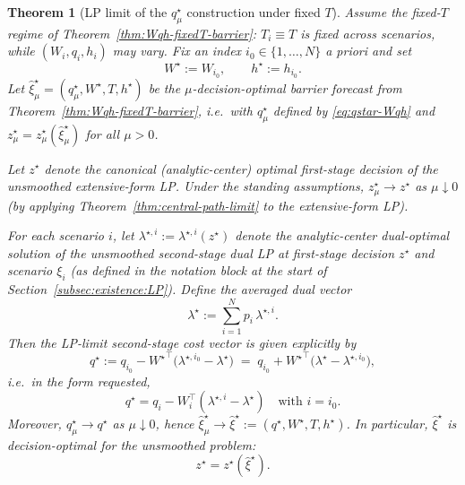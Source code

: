 \documentclass[11pt]{article}
\theoremstyle{plain}
\newtheorem{theorem}{Theorem}[section]
\theoremstyle{definition}
\theoremstyle{remark}
\begin{document}
\begin{theorem}[LP limit of the $q_\mu^\star$ construction under fixed $T$]\label{thm:Wqh-fixedT-LP}
Assume the fixed-$T$ regime of Theorem~\ref{thm:Wqh-fixedT-barrier}: $T_i\equiv T$ is fixed across scenarios,
while $(W_i,q_i,h_i)$ may vary. Fix an index $i_0\in\{1,\dots,N\}$ \emph{a priori} and set
\[
W^\star:=W_{i_0},\qquad h^\star:=h_{i_0}.
\]
Let $\hat\xi_\mu^\star=(q_\mu^\star,W^\star,T,h^\star)$ be the $\mu$-decision-optimal barrier forecast from
Theorem~\ref{thm:Wqh-fixedT-barrier}, i.e.\ with $q_\mu^\star$ defined by \eqref{eq:qstar-Wqh} and
$z_\mu^\star=z_\mu^\star(\hat\xi_\mu^\star)$ for all $\mu>0$.

Let $z^\star$ denote the canonical (analytic-center) optimal first-stage decision of the \emph{unsmoothed}
extensive-form LP. Under the standing assumptions, $z_\mu^\star\to z^\star$ as $\mu\downarrow 0$
(by applying Theorem~\ref{thm:central-path-limit} to the extensive-form LP).

For each scenario $i$, let $\lambda^{\star,i}:=\lambda^{\star,i}(z^\star)$ denote the analytic-center dual-optimal
solution of the \emph{unsmoothed} second-stage dual LP at first-stage decision $z^\star$ and scenario $\xi_i$
(as defined in the notation block at the start of Section~\ref{subsec:existence:LP}). Define the averaged dual vector
\[
\lambda^\star := \sum_{i=1}^N p_i\,\lambda^{\star,i}.
\]
Then the LP-limit second-stage cost vector is given explicitly by
\begin{equation}\label{eq:qstar-fixedT-LP}
q^\star
:= q_{i_0} - {W^\star}^\top\bigl(\lambda^{\star,i_0}-\lambda^\star\bigr)
\;=\; q_{i_0} + {W^\star}^\top\bigl(\lambda^\star-\lambda^{\star,i_0}\bigr),
\end{equation}
i.e.\ in the form requested,
\[
q^\star = q_i - W_i^\top(\lambda^{\star,i}-\lambda^\star)\quad\text{with }i=i_0.
\]
Moreover, $q_\mu^\star\to q^\star$ as $\mu\downarrow 0$, hence $\hat\xi_\mu^\star\to \hat\xi^\star:=(q^\star,W^\star,T,h^\star)$.
In particular, $\hat\xi^\star$ is decision-optimal for the \emph{unsmoothed} problem:
\[
z^\star = z^\star(\hat\xi^\star).
\]
\end{theorem}
\end{document}
